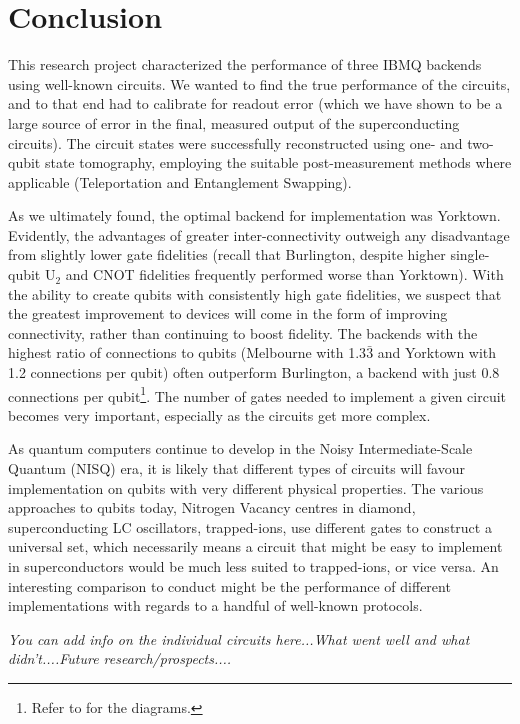 \section{Conclusion}

This research project characterized the performance of three IBMQ backends using
well-known circuits. We wanted to find the true performance of the circuits, and
to that end had to calibrate for readout error (which we have shown to be a
large source of error in the final, measured output of the superconducting
circuits). The circuit states were successfully reconstructed using one- and
two-qubit state tomography, employing the suitable post-measurement methods
where applicable (Teleportation and Entanglement Swapping).

As we ultimately found, the optimal backend for implementation was Yorktown.
Evidently, the advantages of greater inter-connectivity outweigh any
disadvantage from slightly lower gate fidelities (recall that Burlington,
despite higher single-qubit U$_2$ and CNOT fidelities frequently performed worse
than Yorktown). With the ability to create qubits with consistently high gate
fidelities, we suspect that the greatest improvement to devices will come in the
form of improving connectivity, rather than continuing to boost fidelity. The
backends with the highest ratio of connections to qubits (Melbourne with
1.3$\bar{3}$ and Yorktown with 1.2 connections per qubit) often outperform
Burlington, a backend with just 0.8 connections per qubit\footnote{Refer to
   for the diagrams.}. The number of gates needed to
implement a given circuit becomes very important, especially as the circuits get
more complex.

As quantum computers continue to develop in the Noisy Intermediate-Scale Quantum
(NISQ) era, it is likely that different types of circuits will favour
implementation on qubits with very different physical properties. The various
approaches to qubits today, Nitrogen Vacancy centres in diamond, superconducting
LC oscillators, trapped-ions, use different gates to construct a universal set,
which necessarily means a circuit that might be easy to implement in
superconductors would be much less suited to trapped-ions, or vice versa. An
interesting comparison to conduct might be the performance of different
implementations with regards to a handful of well-known protocols.



{\color{red} \emph{You can add info on the individual circuits here...What went well and what didn't....Future research/prospects....}}
